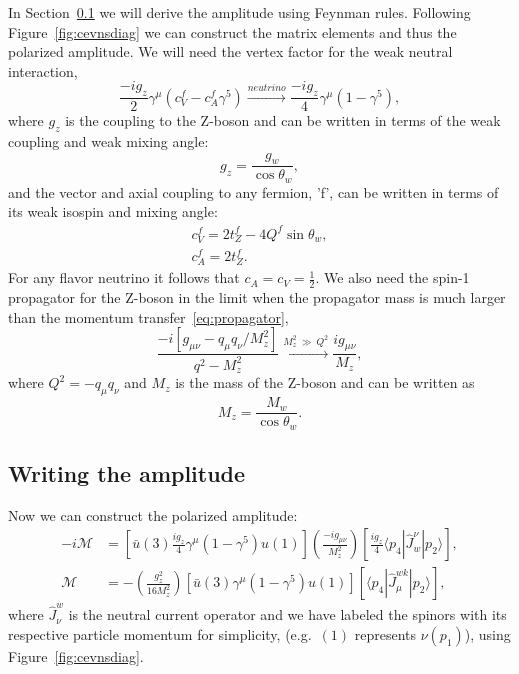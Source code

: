 In Section~\ref{sec:amplitude} we will derive the amplitude using Feynman rules. Following Figure~\ref{fig:cevnsdiag} we can construct the matrix elements and thus the polarized amplitude. We will need the vertex factor for the weak neutral interaction,
\begin{equation}
\frac{-ig_{z}}{2}\gamma ^{\mu}(c_{V}^{f}-c_{A}^{f}\gamma ^{5}) \xrightarrow{neutrino} \frac{-ig_z}{4}\gamma ^{\mu}(1-\gamma ^{5}), \label{eq:vertex} 
\end{equation}
where $g_z$ is the coupling to the Z-boson and can be written in terms of the weak coupling and weak mixing angle:
\begin{equation}\label{eq:zcoupling}
g_z = \frac{g_w}{\cos \theta _w},
\end{equation}
and the vector and axial coupling to any fermion, 'f', can be written in terms of its weak isospin and mixing angle:
\begin{gather}
c_V^f=2t_Z^f-4Q^f\sin \theta _w, \\
c_A^f=2t_Z^f.
\end{gather}
For any flavor neutrino it follows that $c_{A}=c_{V}=\frac{1}{2}$. We also need the spin-1 propagator for the Z-boson in the limit when the propagator mass is much larger than the momentum transfer~\eqref{eq:propagator},
\begin{equation}
\frac{-i[g_{\mu \nu}-q_{\mu}q_{\nu}/M_{z}^{2}]}{q^2-M_{z}^{2}}\xrightarrow{M_{z}^2\ \gg \ Q^2} \frac{i g_{\mu \nu}}{M_z},\label{eq:propagator}
\end{equation}
where $Q^2=- q_{\mu} q_{\nu}$ and $M_z$ is the mass of the Z-boson and can be written as 
\begin{equation}\label{eq:zmass}
M_z = \frac{M_w}{\cos \theta _w}.
\end{equation}

\subsection{Writing the amplitude}
\label{sec:amplitude}
Now we can construct the polarized amplitude:%
\begin{align}
-i\mathcal{M} &= \left[ \bar{u}(3)\frac{ig_{z}}{4}\gamma ^{\mu}(1-\gamma ^{5})u(1)\right] \left( \frac{-ig_{\mu \nu }}{M_{z}^{2}}\right) \left[ \frac{ig_{z}}{4}\langle p_4|\hat{J}^{\nu}_{w}|p_2 \rangle \right], \nonumber \\
\mathcal{M} &= -\left( \frac{g_{z}^{2}}{16 M_{z}^{2}}\right) [\bar{u}(3)\gamma ^{\mu}(1-\gamma ^{5})u(1)][\langle p_4|\hat{J}_{\mu}^{wk}|p_2 \rangle],
\label{eq:unpolarized}
\end{align} 
where $\hat{J}_{\nu}^{w}$ is the neutral current operator and we have labeled the spinors with its respective particle momentum for simplicity, (e.g.\ $(1)$ represents $\nu (p_1)$), using Figure~\ref{fig:cevnsdiag}. 

